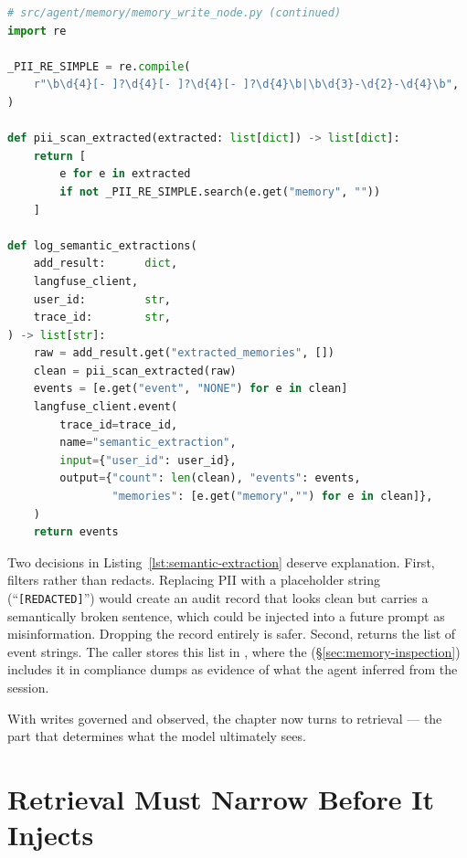 \begin{lstlisting}[language=Python,
  caption={log\_semantic\_extractions with PII scan and Langfuse event emission},
  label={lst:semantic-extraction}]
# src/agent/memory/memory_write_node.py (continued)
import re

_PII_RE_SIMPLE = re.compile(
    r"\b\d{4}[- ]?\d{4}[- ]?\d{4}[- ]?\d{4}\b|\b\d{3}-\d{2}-\d{4}\b",
)

def pii_scan_extracted(extracted: list[dict]) -> list[dict]:
    return [
        e for e in extracted
        if not _PII_RE_SIMPLE.search(e.get("memory", ""))
    ]

def log_semantic_extractions(
    add_result:      dict,
    langfuse_client,
    user_id:         str,
    trace_id:        str,
) -> list[str]:
    raw = add_result.get("extracted_memories", [])
    clean = pii_scan_extracted(raw)
    events = [e.get("event", "NONE") for e in clean]
    langfuse_client.event(
        trace_id=trace_id,
        name="semantic_extraction",
        input={"user_id": user_id},
        output={"count": len(clean), "events": events,
                "memories": [e.get("memory","") for e in clean]},
    )
    return events
\end{lstlisting}

Two decisions in Listing~\ref{lst:semantic-extraction} deserve explanation.
First,  filters rather than redacts. Replacing PII
with a placeholder string (``\texttt{[REDACTED]}'') would create an audit record
that looks clean but carries a semantically broken sentence, which could be
injected into a future prompt as misinformation. Dropping the record entirely
is safer. Second,  returns the list of event
strings. The caller stores this list in , where the 
(\S\ref{sec:memory-inspection}) includes it in compliance dumps as evidence
of what the agent inferred from the session.

With writes governed and observed, the chapter now turns to retrieval --- the
part that determines what the model ultimately sees.

\section{Retrieval Must Narrow Before It Injects}
\label{sec:retrieval-narrow}

